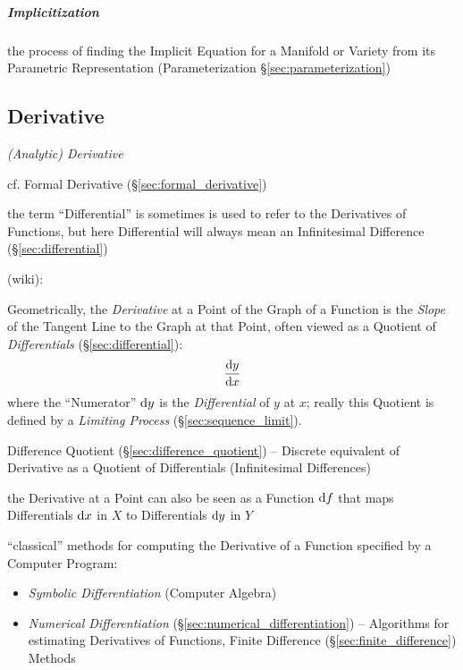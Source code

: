 \subparagraph{Implicitization}\label{sec:implicitization}\hfill

the process of finding the Implicit Equation for a Manifold or Variety from its
Parametric Representation (Parameterization \S\ref{sec:parameterization})



\subsection{Derivative}\label{sec:derivative}

\emph{(Analytic) Derivative}

\fist cf. Formal Derivative (\S\ref{sec:formal_derivative})

the term ``Differential'' is sometimes is used to
refer to the Derivatives of Functions, but here Differential will always mean an
Infinitesimal Difference (\S\ref{sec:differential})

(wiki):

Geometrically, the \emph{Derivative} at a Point of the Graph of a Function is
the \emph{Slope} of the Tangent Line to the Graph at that Point, often viewed as
a Quotient of \emph{Differentials} (\S\ref{sec:differential}):
\[
  \frac{\mathrm{d}y}{\mathrm{d}x}
\]
where the ``Numerator'' $\mathrm{d}y$ is the \emph{Differential} of $y$ at $x$;
really this Quotient is defined by a \emph{Limiting Process}
(\S\ref{sec:sequence_limit}). %

\fist Difference Quotient (\S\ref{sec:difference_quotient}) -- Discrete
equivalent of Derivative as a Quotient of Differentials (Infinitesimal
Differences)

the Derivative at a Point can also be seen as a Function $\mathrm{d}f$ that maps
Differentials $\mathrm{d}x$ in $X$ to Differentials $\mathrm{d}y$ in $Y$

``classical'' methods for computing the Derivative of a Function specified by a
Computer Program:
\begin{itemize}
\item \emph{Symbolic Differentiation} (Computer Algebra)
\item \emph{Numerical Differentiation} (\S\ref{sec:numerical_differentiation})
  -- Algorithms for estimating Derivatives of Functions, Finite Difference
  (\S\ref{sec:finite_difference}) Methods
\end{itemize}

